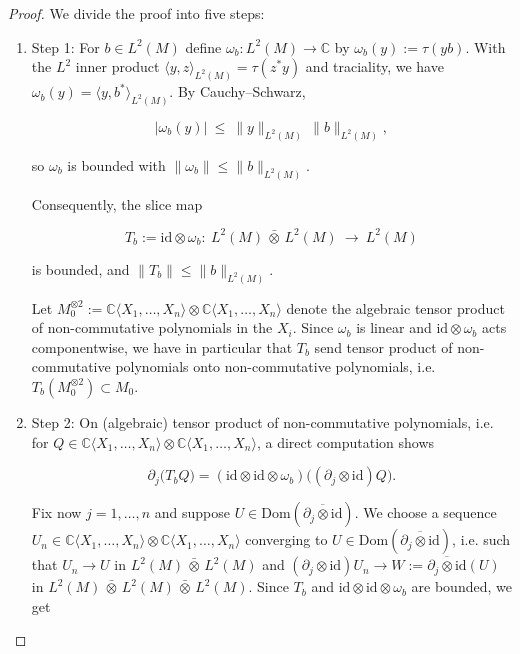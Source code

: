 \documentclass[10pt,a4paper,reqno]{amsart}
\newcommand{\C}{\mathbb{C}}
\newcommand{\Dom}{\mathrm{Dom}}
\begin{document}
\begin{proof}
We divide the proof into five steps:
\begin{enumerate}

 \item Step 1: For $b\in L^2(M)$ define $\omega_b:L^2(M)\to\C$ by
$\omega_b(y):=\tau(y b)$.  
With the $L^2$ inner product $\langle y,z\rangle_{L^2(M)}=\tau(z^\ast y)$
and traciality, we have $\omega_b(y)=\langle y, b^\ast\rangle_{L^2(M)}$.
By Cauchy--Schwarz,


\[
  |\omega_b(y)|\ \le\ \|y\|_{L^2(M)}\,\|b\|_{L^2(M)},
\]


so $\omega_b$ is bounded with $\|\omega_b\|\le \|b\|_{L^2(M)}$.

Consequently, the slice map


\[
  T_b:=\mathrm{id}\otimes \omega_b:\ 
  L^2(M)\,\bar\otimes\,L^2(M)\ \longrightarrow\ L^2(M)
\]


is bounded, and $\|T_b\|\le \|b\|_{L^2(M)}$.

Let $M_0^{\otimes 2}:=\C\langle X_1,\ldots,X_n\rangle
\otimes \C\langle X_1,\ldots,X_n\rangle$ denote the algebraic tensor product of non-commutative polynomials in the $X_i$.
Since $\omega_b$ is linear and $\mathrm{id}\otimes\omega_b$ acts
componentwise, we have in particular that $T_b$ send tensor product of non-commutative polynomials onto non-commutative polynomials, i.e. $T_b(M_0^{\otimes 2})\subset M_0$.


  \item Step 2: On (algebraic) tensor product of non-commutative polynomials, i.e. for  $Q\in\mathbb{C}\langle X_1,\ldots,X_n\rangle\otimes\mathbb{C}\langle X_1,\ldots,X_n\rangle$, a direct computation shows
  

\[
  \partial_j\big(T_b Q\big) = (\mathrm{id}\otimes \mathrm{id}\otimes \omega_b)\big((\partial_j\otimes \mathrm{id})Q\big).
  \]



  Fix now $j=1,\ldots,n$ and  suppose $U\in \Dom(\overline{\partial_j\otimes \mathrm{id}})$.  We 
  choose a sequence $U_n\in  \mathbb C\langle X_1,\ldots,X_n\rangle\otimes \mathbb C\langle X_1,\ldots,X_n\rangle$ converging to $U\in \Dom(\overline{\partial_j\otimes \mathrm{id}})$, i.e. such that $U_n\to U$ in $L^2(M)\,\bar\otimes\,L^2(M)$ and  
  $(\partial_j\otimes \mathrm{id})U_n\to W:=\overline{\partial_j\otimes \mathrm{id}}(U)$ in $L^2(M)\,\bar\otimes\,L^2(M)\,\bar\otimes\,L^2(M)$.  
  Since $T_b$ and $\mathrm{id}\otimes\mathrm{id}\otimes \omega_b$ are bounded, we get
  


\end{enumerate}
\end{proof}
\end{document}
